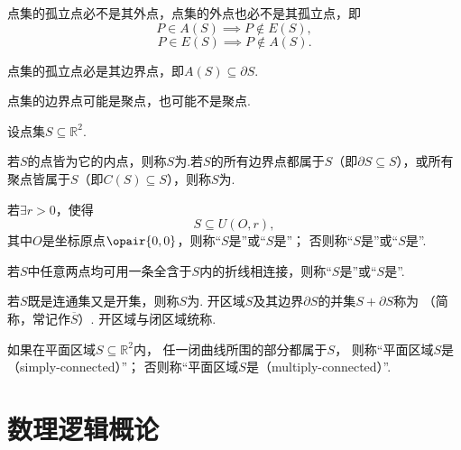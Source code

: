 \begin{property}
点集的孤立点必不是其外点，点集的外点也必不是其孤立点，即\[
P \in A(S) \implies P \notin E(S),
\]\[
P \in E(S) \implies P \notin A(S).
\]
\end{property}

\begin{property}
点集的孤立点必是其边界点，即\(A(S) \subseteq \partial{S}\).
\end{property}

\begin{property}
点集的边界点可能是聚点，也可能不是聚点.
\end{property}

\begin{definition}
设点集\(S \subseteq \mathbb{R}^2\).

若\(S\)的点皆为它的内点，则称\(S\)为.若\(S\)的所有边界点都属于\(S\)（即\(\partial S \subseteq S\)），或所有聚点皆属于\(S\)（即\(C(S) \subseteq S\)），则称\(S\)为.

若\(\exists r > 0\)，使得\[
S \subseteq U(O,r),
\]其中\(O\)是坐标原点\(\opair{0,0}\)，则称“\(S\)是”或“\(S\)是”；
否则称“\(S\)是”或“\(S\)是”.

若\(S\)中任意两点均可用一条全含于\(S\)内的折线相连接，则称“\(S\)是”或“\(S\)是”.

若\(S\)既是连通集又是开集，则称\(S\)为.
开区域\(S\)及其边界\(\partial S\)的并集\(S + \partial S\)称为%
（简称，常记作\(\overline{S}\)）.
开区域与闭区域统称.
\end{definition}

\begin{definition}\label{definition:集合论.平面区域的连通性}
如果在平面区域\(S \subseteq \mathbb{R}^2\)内，%
任一闭曲线所围的部分都属于\(S\)，%
则称“平面区域\(S\)是（simply-connected）”；
否则称“平面区域\(S\)是（multiply-connected）”.
\end{definition}










\section{数理逻辑概论}
